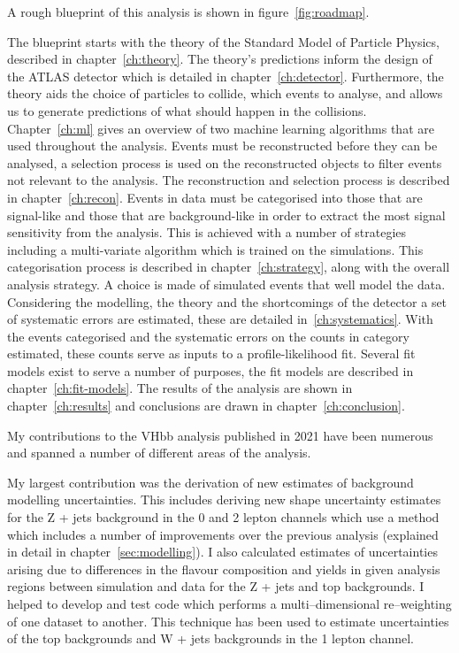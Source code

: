 A rough blueprint of this analysis is shown in figure~\ref{fig:roadmap}.

The blueprint starts with the theory of the Standard Model of Particle Physics,
described in chapter~\ref{ch:theory}. The theory's predictions inform the
design of the ATLAS detector which is detailed in chapter~\ref{ch:detector}.
Furthermore, the theory aids the choice of particles to collide, which events to
analyse, and allows us to generate predictions of what should happen in the
collisions. Chapter~\ref{ch:ml} gives an overview of two machine learning
algorithms that are used throughout the analysis. Events must be reconstructed
before they can be analysed, a selection process is used on the reconstructed
objects to filter events not relevant to the analysis. The reconstruction and
selection process is described in chapter~\ref{ch:recon}. Events in data must
be categorised into those that are signal-like and those that are
background-like in order to extract the most signal sensitivity from the
analysis. This is achieved with a number of strategies including a multi-variate
algorithm which is trained on the simulations. This categorisation process is
described in chapter~\ref{ch:strategy}, along with the overall analysis
strategy. A choice is made of simulated events that well model the data.
Considering the modelling, the theory and the shortcomings of the detector a set
of systematic errors are estimated, these are detailed in~\ref{ch:systematics}.
With the events categorised and the systematic errors on the counts in category
estimated, these counts serve as inputs to a profile-likelihood fit. Several fit
models exist to serve a number of purposes, the fit models are described in
chapter~\ref{ch:fit-models}. The results of the analysis are shown in
chapter~\ref{ch:results} and conclusions are drawn in
chapter~\ref{ch:conclusion}.


My contributions to the VHbb analysis published in 2021 have been numerous and
spanned a number of different areas of the analysis.

My largest contribution was the derivation of new estimates of background
modelling uncertainties. This includes deriving new shape uncertainty estimates
for the Z + jets background in the 0 and 2 lepton channels which use a method
which includes a number of improvements over the previous analysis (explained in
detail in chapter~\ref{sec:modelling}). I also calculated estimates of
uncertainties arising due to differences in the flavour composition and yields
in given analysis regions between simulation and data for the Z + jets and top
backgrounds. I helped to develop and test code which performs a
multi--dimensional re--weighting of one dataset to another. This technique has
been used to estimate uncertainties of the top backgrounds and W + jets
backgrounds in the 1 lepton channel.

